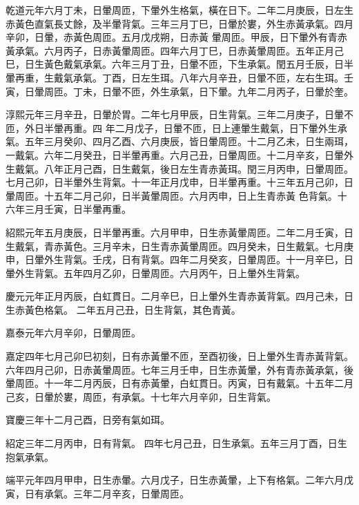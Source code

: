 \begin{pinyinscope}
 乾道元年六月丁未，日暈周匝，下暈外生格氣，橫在日下。二年二月庚辰，日左生赤黃色直氣長丈餘，及半暈背氣。三年三月丁巳，日暈於婁，外生赤黃承氣。四月辛卯，日暈，赤黃色周匝。五月戊戌朔，日赤黃
 暈周匝。甲辰，日下暈外有青赤黃承氣。六月丙子，日赤黃暈周匝。四年六月丁巳，日赤黃暈周匝。五年正月己巳，日生黃色戴氣承氣。六年三月丁丑，日暈不匝，下生承氣。閏五月壬辰，日半暈再重，生戴氣承氣。丁酉，日左生珥。八年六月辛丑，日暈不匝，左右生珥。壬寅，日暈周匝。丁未，日暈不匝，外生承氣，日下暈。九年二月丙子，日暈於奎。



 淳熙元年三月辛丑，日暈於胃。二年七月甲辰，日生背氣。三年二月庚子，日暈不匝，外日半暈再重。四
 年二月戊子，日暈不匝，日上連暈生戴氣，日下暈外生承氣。五年三月癸卯、四月乙酉、六月庚辰，皆日暈周匝。十二月乙未，日生兩珥，一戴氣。六年二月癸丑，日半暈再重。六月己丑，日暈周匝。十二月辛亥，日暈外生戴氣。八年正月己酉，日生戴氣，後日左生青赤黃珥。閏三月丙申，日暈周匝。七月己卯，日半暈外生背氣。十一年正月戊申，日半暈再重。十三年五月己卯，日暈周匝。十五年二月己卯，日半黃暈周匝。六月丙申，日上生青赤黃
 色背氣。十六年三月壬寅，日半暈再重。



 紹熙元年五月庚辰，日半暈再重。六月甲申，日生赤黃暈周匝。二年二月壬寅，日生戴氣，青赤黃色。三月辛未，日生青赤黃暈周匝。四月癸未，日生戴氣。七月庚申，日暈外生背氣。壬戌，日有背氣。四年二月癸亥，日暈周匝。十一月辛巳，日暈外生背氣。五年四月乙卯，日暈周匝。六月丙午，日上暈外生背氣。



 慶元元年正月丙辰，白虹貫日。二月辛巳，日上暈外生青赤黃背氣。四月己未，日生赤黃色格氣。
 二年五月己丑，日生背氣，其色青黃。



 嘉泰元年六月辛卯，日暈周匝。



 嘉定四年七月己卯巳初刻，日有赤黃暈不匝，至酉初後，日上暈外生青赤黃背氣。六年四月己卯，日赤黃暈周匝。七年三月壬申，日生赤黃暈，外有青赤黃承氣，後暈周匝。十一年二月丙辰，日有赤黃暈，白虹貫日。丙寅，日有戴氣。十五年二月己亥，日暈於婁，周匝，有承氣。十七年六月辛卯，日生背氣。



 寶慶三年十二月己酉，日旁有氣如珥。



 紹定三年二月丙申，日有背氣。
 四年七月己丑，日生承氣。五年三月丁酉，日生抱氣承氣。



 端平元年四月甲申，日生赤暈。六月戊子，日生赤黃暈，上下有格氣。二年六月戊寅，日有承氣。三年二月辛亥，日暈周匝。




\end{pinyinscope}
